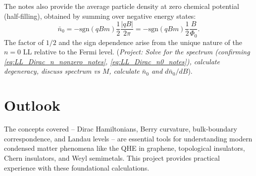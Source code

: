 \documentclass[11pt]{article}
\newcommand{\sgn}{\text{sgn}}
\begin{document}
The notes also provide the average particle density at zero chemical potential (half-filling), obtained by summing over negative energy states:
\begin{equation}
\bar{n}_0 = -\sgn(qBm) \frac{1}{2} \frac{|qB|}{2\pi} = -\sgn(qBm) \frac{1}{2} \frac{B}{\Phi_0}.
\label{eq:density_half_filling_notes}
\end{equation}
The factor of $1/2$ and the sign dependence arise from the unique nature of the $n=0$ LL relative to the Fermi level. (\textit{Project: Solve for the spectrum (confirming \eqref{eq:LL_Dirac_n_nonzero_notes}, \eqref{eq:LL_Dirac_n0_notes}), calculate degeneracy, discuss spectrum vs $M$, calculate $\bar{n}_0$ and $d\bar{n}_0/dB$}).

\section{Outlook}

The concepts covered – Dirac Hamiltonians, Berry curvature, bulk-boundary correspondence, and Landau levels – are essential tools for understanding modern condensed matter phenomena like the QHE in graphene, topological insulators, Chern insulators, and Weyl semimetals. This project provides practical experience with these foundational calculations.
\end{document}
